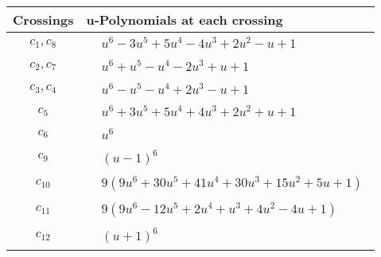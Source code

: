 \documentclass[1p]{elsarticle_modified}
\theoremstyle{definition}
\begin{document}
\begin{tabular}{m{50pt}|m{274pt}}
Crossings & \hspace{64pt}u-Polynomials at each crossing \\
\hline $$\begin{aligned}c_{1},c_{8}\end{aligned}$$&$\begin{aligned}
&u^6-3 u^5+5 u^4-4 u^3+2 u^2- u+1
\end{aligned}$\\
\hline $$\begin{aligned}c_{2},c_{7}\end{aligned}$$&$\begin{aligned}
&u^6+u^5- u^4-2 u^3+u+1
\end{aligned}$\\
\hline $$\begin{aligned}c_{3},c_{4}\end{aligned}$$&$\begin{aligned}
&u^6- u^5- u^4+2 u^3- u+1
\end{aligned}$\\
\hline $$\begin{aligned}c_{5}\end{aligned}$$&$\begin{aligned}
&u^6+3 u^5+5 u^4+4 u^3+2 u^2+u+1
\end{aligned}$\\
\hline $$\begin{aligned}c_{6}\end{aligned}$$&$\begin{aligned}
&u^6
\end{aligned}$\\
\hline $$\begin{aligned}c_{9}\end{aligned}$$&$\begin{aligned}
&(u-1)^6
\end{aligned}$\\
\hline $$\begin{aligned}c_{10}\end{aligned}$$&$\begin{aligned}
&9(9 u^6+30 u^5+41 u^4+30 u^3+15 u^2+5 u+1)
\end{aligned}$\\
\hline $$\begin{aligned}c_{11}\end{aligned}$$&$\begin{aligned}
&9(9 u^6-12 u^5+2 u^4+u^3+4 u^2-4 u+1)
\end{aligned}$\\
\hline $$\begin{aligned}c_{12}\end{aligned}$$&$\begin{aligned}
&(u+1)^6
\end{aligned}$\\
\hline
\end{tabular}\\~\\
\end{document}
